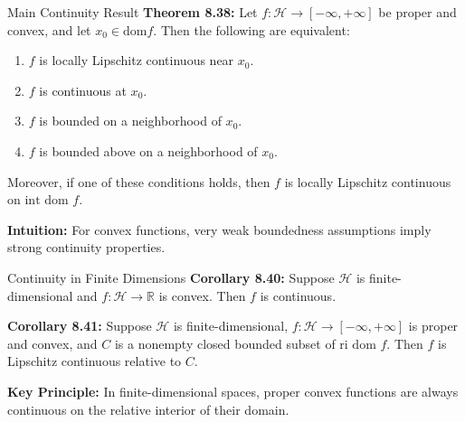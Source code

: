 \documentclass[aspectratio=169,10pt]{beamer}
\begin{document}
\begin{frame}[fragile]{Main Continuity Result}
    \textbf{Theorem 8.38:} Let $f : \mathcal{H} \to [-\infty, +\infty]$ be proper and convex, 
    and let $x_0 \in \text{dom} f$. Then the following are equivalent:
    
    \begin{enumerate}
        \item $f$ is locally Lipschitz continuous near $x_0$.
        \item $f$ is continuous at $x_0$.
        \item $f$ is bounded on a neighborhood of $x_0$.
        \item $f$ is bounded above on a neighborhood of $x_0$.
    \end{enumerate}

    \vspace{0.3cm}

    Moreover, if one of these conditions holds, then $f$ is locally Lipschitz continuous on $\text{int dom } f$.

    \vspace{0.3cm}

    \textbf{Intuition:} For convex functions, very weak boundedness assumptions imply strong continuity properties.
\end{frame}

\begin{frame}[fragile]{Continuity in Finite Dimensions}
    \textbf{Corollary 8.40:} Suppose $\mathcal{H}$ is finite-dimensional and $f : \mathcal{H} \to \mathbb{R}$ is convex. 
    Then $f$ is continuous.

    \vspace{0.3cm}

    \textbf{Corollary 8.41:} Suppose $\mathcal{H}$ is finite-dimensional, $f : \mathcal{H} \to [-\infty, +\infty]$ 
    is proper and convex, and $C$ is a nonempty closed bounded subset of $\text{ri dom } f$. 
    Then $f$ is Lipschitz continuous relative to $C$.

    \vspace{0.3cm}

    \textbf{Key Principle:} In finite-dimensional spaces, proper convex functions are always continuous on the 
    relative interior of their domain.
\end{frame}
\end{document}
